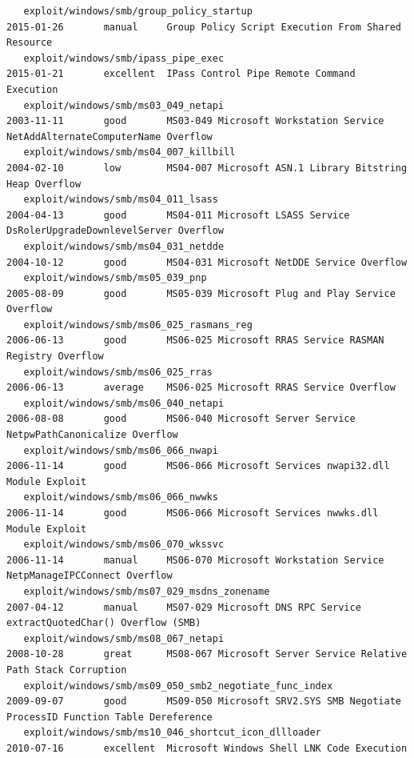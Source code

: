 \documentclass[10pt,a4paper]{report}
\begin{document}
\begin{lstlisting}
   exploit/windows/smb/group_policy_startup                        2015-01-26       manual     Group Policy Script Execution From Shared Resource
   exploit/windows/smb/ipass_pipe_exec                             2015-01-21       excellent  IPass Control Pipe Remote Command Execution
   exploit/windows/smb/ms03_049_netapi                             2003-11-11       good       MS03-049 Microsoft Workstation Service NetAddAlternateComputerName Overflow
   exploit/windows/smb/ms04_007_killbill                           2004-02-10       low        MS04-007 Microsoft ASN.1 Library Bitstring Heap Overflow
   exploit/windows/smb/ms04_011_lsass                              2004-04-13       good       MS04-011 Microsoft LSASS Service DsRolerUpgradeDownlevelServer Overflow
   exploit/windows/smb/ms04_031_netdde                             2004-10-12       good       MS04-031 Microsoft NetDDE Service Overflow
   exploit/windows/smb/ms05_039_pnp                                2005-08-09       good       MS05-039 Microsoft Plug and Play Service Overflow
   exploit/windows/smb/ms06_025_rasmans_reg                        2006-06-13       good       MS06-025 Microsoft RRAS Service RASMAN Registry Overflow
   exploit/windows/smb/ms06_025_rras                               2006-06-13       average    MS06-025 Microsoft RRAS Service Overflow
   exploit/windows/smb/ms06_040_netapi                             2006-08-08       good       MS06-040 Microsoft Server Service NetpwPathCanonicalize Overflow
   exploit/windows/smb/ms06_066_nwapi                              2006-11-14       good       MS06-066 Microsoft Services nwapi32.dll Module Exploit
   exploit/windows/smb/ms06_066_nwwks                              2006-11-14       good       MS06-066 Microsoft Services nwwks.dll Module Exploit
   exploit/windows/smb/ms06_070_wkssvc                             2006-11-14       manual     MS06-070 Microsoft Workstation Service NetpManageIPCConnect Overflow
   exploit/windows/smb/ms07_029_msdns_zonename                     2007-04-12       manual     MS07-029 Microsoft DNS RPC Service extractQuotedChar() Overflow (SMB)
   exploit/windows/smb/ms08_067_netapi                             2008-10-28       great      MS08-067 Microsoft Server Service Relative Path Stack Corruption
   exploit/windows/smb/ms09_050_smb2_negotiate_func_index          2009-09-07       good       MS09-050 Microsoft SRV2.SYS SMB Negotiate ProcessID Function Table Dereference
   exploit/windows/smb/ms10_046_shortcut_icon_dllloader            2010-07-16       excellent  Microsoft Windows Shell LNK Code Execution

\end{lstlisting}
\end{document}
